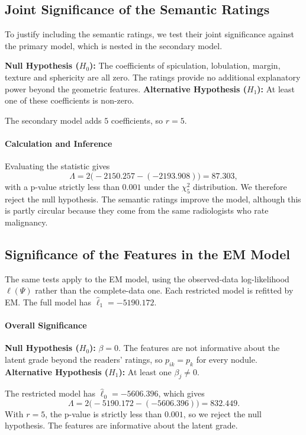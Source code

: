 \documentclass[12pt]{article}
\begin{document}
\subsection{Joint Significance of the Semantic Ratings}

To justify including the semantic ratings, we test their joint significance
against the primary model, which is nested in the secondary model.

\begin{itemize}
    \ii \textbf{Null Hypothesis ($H_0$):} The coefficients of spiculation,
    lobulation, margin, texture and sphericity are all zero. The ratings
    provide no additional explanatory power beyond the geometric features.
    \ii \textbf{Alternative Hypothesis ($H_1$):} At least one of these
    coefficients is non-zero.
\end{itemize}

The secondary model adds $5$ coefficients, so $r = 5$.

\paragraph{Calculation and Inference}
Evaluating the statistic gives
\[
  \Lambda = 2\bigl(-2150.257 - (-2193.908)\bigr) = 87.303,
\]
with a p-value strictly less than $0.001$ under the $\chi^2_5$ distribution.
We therefore reject the null hypothesis. The semantic ratings improve the
model, although this is partly circular because they come from the same
radiologists who rate malignancy.

\subsection{Significance of the Features in the EM Model}

The same tests apply to the EM model, using the observed-data log-likelihood
$\ell(\Psi)$ rather than the complete-data one. Each restricted model is
refitted by EM. The full model has $\hat{\ell}_1 = -5190.172$.

\paragraph{Overall Significance}
\begin{itemize}
    \ii \textbf{Null Hypothesis ($H_0$):} $\beta = 0$. The features are
    not informative about the latent grade beyond the readers' ratings, so
    $p_{ik} = p_k$ for every nodule.
    \ii \textbf{Alternative Hypothesis ($H_1$):} At least one
    $\beta_j \neq 0$.
\end{itemize}
The restricted model has $\hat{\ell}_0 = -5606.396$, which gives
\[
  \Lambda = 2\bigl(-5190.172 - (-5606.396)\bigr) = 832.449.
\]
With $r = 5$, the p-value is strictly less than $0.001$, so we reject the
null hypothesis. The features are informative about the latent grade.
\end{document}
